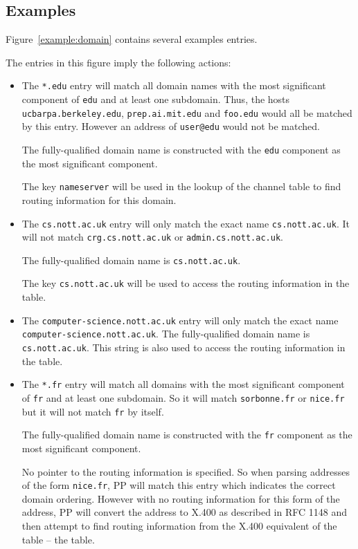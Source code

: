 \subsection*{Examples}

Figure~\ref{example:domain} contains several examples entries.


The entries in this figure imply the following actions:
\begin{itemize}

\item The \verb|*.edu| entry will match all domain names with the most
significant component of \verb|edu| and at least one subdomain. Thus,
the hosts \verb|ucbarpa.berkeley.edu|, \verb|prep.ai.mit.edu| and
\verb|foo.edu| would all be matched by this entry. However an address
of \verb|user@edu| would not be matched.

The fully-qualified domain name is constructed with the \verb+edu+
component as the most significant component.

The key \verb+nameserver+ will be used in the lookup of the channel table to
find routing information for this domain.

\item The \verb|cs.nott.ac.uk| entry will only match the exact name
\verb|cs.nott.ac.uk|. It will not match \verb|crg.cs.nott.ac.uk| or
\verb|admin.cs.nott.ac.uk|.

The fully-qualified domain name is \verb+cs.nott.ac.uk+.

The key \verb+cs.nott.ac.uk+ will be used to
access the routing information in the  table.

\item The \verb+computer-science.nott.ac.uk+ entry will only match the
exact name \verb+computer-science.nott.ac.uk+.  The fully-qualified
domain name is \verb+cs.nott.ac.uk+.  This string is also used to
access the routing information in the
 table.

\item The \verb+*.fr+ entry will match all domains with the most
significant component of \verb|fr| and at least one subdomain.
So it will match \verb+sorbonne.fr+ or \verb+nice.fr+ but it will not
match \verb+fr+ by itself.

The fully-qualified domain name is constructed with the \verb+fr+
component as the most significant component.

No pointer to the routing information is specified.
So when parsing addresses of the form \verb+nice.fr+, PP will match this
entry which indicates the correct domain ordering.
However with no routing information for this form of the address, PP
will convert the address to X.400 as described in RFC 1148 and then
attempt to find routing information from the X.400 equivalent of the
 table -- the  table.


\end{itemize}
